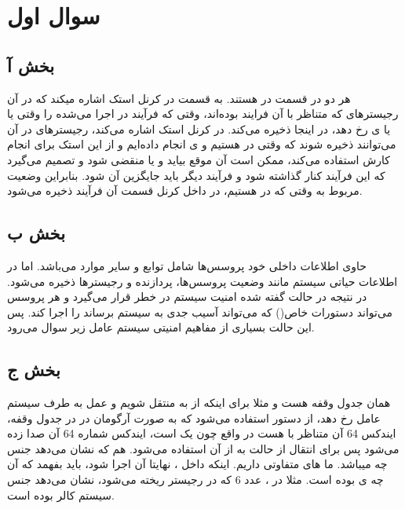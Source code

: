 \documentclass{article}
\begin{document}


\tableofcontents
\newpage

\section{سوال اول}

\subsection{بخش آ}
هر دو در قسمت  در  هستند. 
 به قسمت  در کرنل استک اشاره میکند که در آن رجیسترهای  که متناظر با آن فرایند بوده‌اند، وقتی که فرآیند در  اجرا می‌شده را وقتی  یا  یا  ی رخ دهد، در اینجا ذخیره می‌کند. در کرنل استک اشاره می‌کند، رجیسترهای  در آن می‌توانند ذخیره شوند که وقتی در  هستیم و ی انجام داده‌ایم و  از این استک برای انجام کارش استفاده می‌کند، ممکن است آن موقع  بیاید و یا  منقضی شود و  تصمیم می‌گیرد که این فرآیند کنار گذاشته شود و فرآیند دیگر باید جایگزین آن شود. بنابراین وضعیت مربوط به  وقتی که در  هستیم، در داخل کرنل قسمت آن فرآیند ذخیره می‌شود.
\subsection{بخش ب}
 حاوی اطلاعات داخلی خود پروسس‌ها شامل توابع و سایر موارد می‌باشد. اما در  اطلاعات حیاتی سیستم مانند وضعیت پروسس‌ها، پردازنده و رجیسترها ذخیره می‌شود. در نتیجه در حالت گفته شده امنیت سیستم در خطر قرار می‌گیرد و هر پروسس می‌تواند دستورات خاص() که می‌تواند آسیب جدی به سیستم برساند را اجرا کند. پس این حالت بسیاری از مفاهیم امنیتی سیستم عامل زیر سوال می‌رود.
\subsection{بخش ج}
 همان جدول وقفه هست و مثلا برای اینکه از  به  منتقل شویم و عمل  به طرف سیستم عامل رخ دهد، از دستور  استفاده می‌شود که به صورت آرگومان در  در جدول وقفه، ایندکس 64 آن متناظر با  هست در واقع چون یک  است، ایندکس شماره 64 آن صدا زده می‌شود پس برای انتقال از حالت  به  از آن استفاده می‌شود. 
 هم که نشان می‌دهد جنس  چه میباشد. ما  های متفاوتی داریم. اینکه داخل ، نهایتا  آن اجرا شود، باید بفهمد که آن چه ی بوده است. مثلا در ، عدد 6 که در رجیستر  ریخته می‌شود، نشان می‌دهد جنس سیستم کالر  بوده است.
\end{document}

